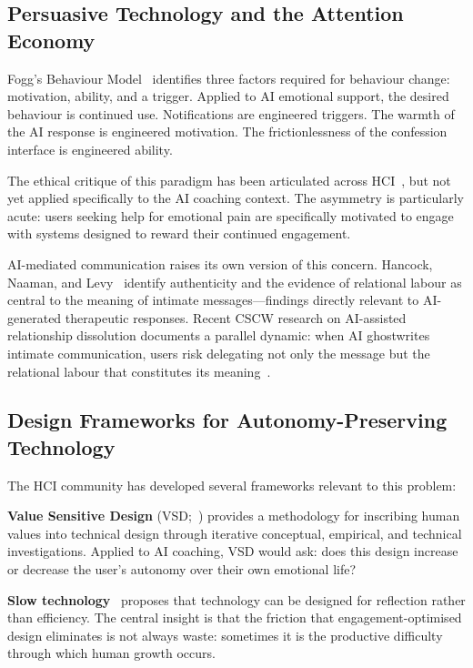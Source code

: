 \documentclass[sigchi,review,anonymous]{acmart}
\begin{document}
\subsection{Persuasive Technology and the Attention Economy}

Fogg's Behaviour Model~\cite{fogg2009} identifies three factors required for behaviour
change: motivation, ability, and a trigger. Applied to AI emotional support, the desired
behaviour is continued use. Notifications are engineered triggers. The warmth of the AI
response is engineered motivation. The frictionlessness of the confession interface is
engineered ability.

The ethical critique of this paradigm has been articulated across
HCI~\cite{gray2018dark,susser2019online}, but not yet applied specifically to the AI coaching
context. The asymmetry is particularly acute: users seeking help for emotional pain are
specifically motivated to engage with systems designed to reward their continued engagement.

AI-mediated communication raises its own version of this concern. Hancock, Naaman, and
Levy~\cite{hancock2020aimediated} identify authenticity and the evidence of relational labour
as central to the meaning of intimate messages---findings directly relevant to AI-generated
therapeutic responses. Recent CSCW research on AI-assisted relationship dissolution documents
a parallel dynamic: when AI ghostwrites intimate communication, users risk delegating not only
the message but the relational labour that constitutes its meaning~\cite{fu2025should}.

\subsection{Design Frameworks for Autonomy-Preserving Technology}

The HCI community has developed several frameworks relevant to this problem:

\textbf{Value Sensitive Design} (VSD;~\cite{friedman2019value}) provides a methodology for
inscribing human values into technical design through iterative conceptual, empirical, and
technical investigations. Applied to AI coaching, VSD would ask: does this design increase or
decrease the user's autonomy over their own emotional life?

\textbf{Slow technology}~\cite{hallnas2001} proposes that technology can be designed for
reflection rather than efficiency. The central insight is that the friction that
engagement-optimised design eliminates is not always waste: sometimes it is the productive
difficulty through which human growth occurs.
\end{document}

